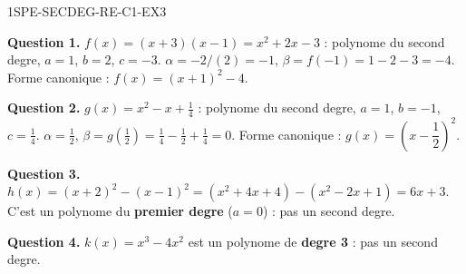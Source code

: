 
\begin{corrige}{1SPE-SECDEG-RE-C1-EX3}

\textbf{Question 1.} $f(x) = (x+3)(x-1) = x^2 + 2x - 3$ : polynome du second degre, $a = 1$, $b = 2$, $c = -3$.
$\alpha = -2/(2) = -1$, $\beta = f(-1) = 1 - 2 - 3 = -4$.
Forme canonique : $f(x) = (x+1)^2 - 4$.

\textbf{Question 2.} $g(x) = x^2 - x + \frac{1}{4}$ : polynome du second degre, $a = 1$, $b = -1$, $c = \frac{1}{4}$.
$\alpha = \frac{1}{2}$, $\beta = g\!\left(\frac{1}{2}\right) = \frac{1}{4} - \frac{1}{2} + \frac{1}{4} = 0$.
Forme canonique : $g(x) = \left(x - \dfrac{1}{2}\right)^2$.


\textbf{Question 3.} $h(x) = (x+2)^2 - (x-1)^2 = (x^2+4x+4) - (x^2-2x+1) = 6x + 3$.
C'est un polynome du \textbf{premier degre} ($a = 0$) : pas un second degre.

\textbf{Question 4.} $k(x) = x^3 - 4x^2$ est un polynome de \textbf{degre 3} : pas un second degre.

\end{corrige}
